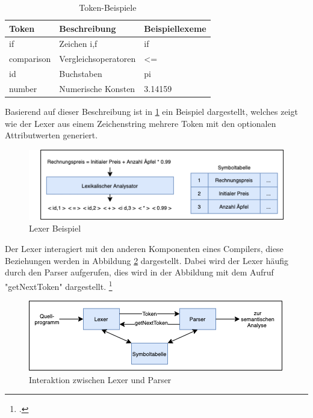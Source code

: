 \begin{table}[!ht]
\begin{tabular}{|l|l|l|}
\hline
\textbf{Token} & \textbf{Beschreibung} & \textbf{Beispiellexeme} \\ \hline
if             & Zeichen i,f           & if                      \\ \hline
comparison     & Vergleichsoperatoren  & \textless{}=            \\ \hline
id             & Buchstaben            & pi                      \\ \hline
number         & Numerische Konsten    & 3.14159                 \\ \hline
\end{tabular}

\caption[Token-Beispiele]{Token-Beispiele\protect\footnotemark}
 \label{tab:Tokens}
\end{table}

Basierend auf dieser Beschreibung ist in \ref{fig:LexerResult} ein Beispiel dargestellt, welches zeigt wie der Lexer aus einem Zeichenstring mehrere Token mit den optionalen Attributwerten generiert.  
 
\begin{figure}[!ht]
 \includegraphics{Images/Compiler/LexerResult.png}
 \caption[Lexer Beispiel]{Lexer Beispiel\protect\footnotemark}
 \label{fig:LexerResult}
\end{figure}

Der Lexer interagiert mit den anderen Komponenten eines Compilers, diese  Beziehungen werden in Abbildung \ref{fig:LexerInteraktionen}  dargestellt.  Dabei wird der Lexer häufig durch den Parser aufgerufen,  dies wird in der Abbildung mit dem Aufruf "getNextToken" dargestellt.  \footcite[Vgl.][S. 135]{Ullmann2008} 

\begin{figure}[!ht]
 \includegraphics{Images/Compiler/Lexer.png}
 \caption[Interaktion zwischen Lexer und Parser]{Interaktion zwischen Lexer und Parser\protect\footnotemark}
 \label{fig:LexerInteraktionen}
\end{figure}




